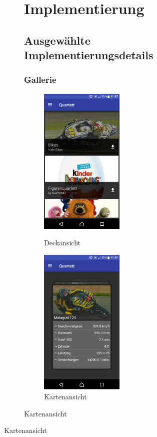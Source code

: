 \documentclass{scrartcl}
\begin{document}
\begin{figure}[!ht]
\begin{figure}[!ht]
\section{Implementierung}
\subsection{Ausgewählte Implementierungsdetails}
\subsubsection{Gallerie}

\begin{figure}
  \centering
  \begin{minipage}{0.45\textwidth}
    \centering
    \includegraphics[width=4cm]{img/gallery_decks.png}
    \caption{Deckansicht}
  \end{minipage}
  \hfill
  \begin{minipage}{0.45\textwidth}
    \centering
    \includegraphics[width=4cm]{img/gallery_cards.png}
    \caption{Kartenansicht}
  \end{minipage}
\end{figure}


\end{figure}
\end{figure}
\end{document}
